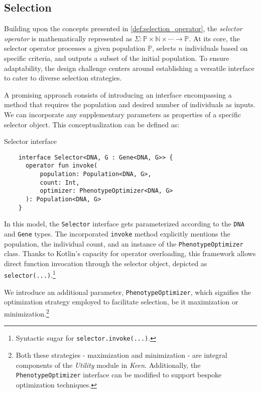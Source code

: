 \subsection{Selection}
\label{sec:keen:operators:selection}
  Building upon the concepts presented in \vref{def:selection_operator}, the 
  \emph{selector operator} is mathematically represented as \(\Sigma : \mathbb
  {P} \times \mathbb{N} \times \cdots \to \mathbb{P}\).
  At its core, the selector operator processes a given population 
  \(\mathbb{P}\), selects \(n\) individuals based on specific criteria, and 
  outputs a subset of the initial population.
  To ensure adaptability, the design challenge centers around establishing a 
  versatile interface to cater to diverse selection strategies.

  A promising approach consists of introducing an interface encompassing a 
  method that requires the population and desired number of individuals as 
  inputs.
  We can incorporate any supplementary parameters as properties of a specific 
  selector object.
  This conceptualization can be defined as:

  \begin{listing}[H]
    \caption{Selector interface}
    \label{lst:keen:operators:selection:interface}
  \end{listing}
  \begin{verbatim}
    interface Selector<DNA, G : Gene<DNA, G>> {
      operator fun invoke(
          population: Population<DNA, G>,
          count: Int,
          optimizer: PhenotypeOptimizer<DNA, G>
      ): Population<DNA, G>
    }
  \end{verbatim}

  In this model, the \texttt{Selector} interface gets parameterized according 
  to the \texttt{DNA} and \texttt{Gene} types.
  The incorporated \texttt{invoke} method explicitly mentions the population, 
  the individual count, and an instance of the \texttt{PhenotypeOptimizer} 
  class.
  Thanks to Kotlin's capacity for operator overloading, this framework allows 
  direct function invocation through the selector object, depicted as \texttt
  {selector(...)}.\footnote{Syntactic sugar for \texttt{selector.invoke(...)}.}

  We introduce an additional parameter, \texttt{PhenotypeOptimizer}, which 
  signifies the optimization strategy employed to facilitate selection, be it 
  maximization or minimization.\footnote{
    Both these strategies - maximization and minimization - are integral 
    components of the \textit{Utility} module in \textit{Keen}.
    Additionally, the \texttt{PhenotypeOptimizer} interface can be modified to 
    support bespoke optimization techniques.
  }

